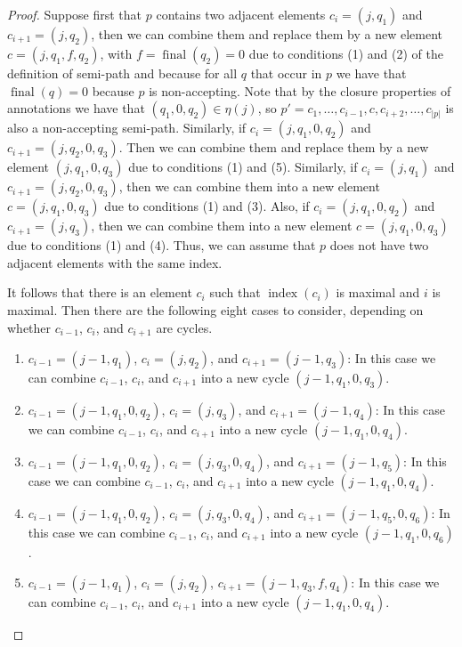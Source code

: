 \documentclass[10pt,a4paper]{amsart}
\theoremstyle{plain}
\theoremstyle{definition}
\theoremstyle{definition}
\DeclareMathOperator{\?}{?}
\DeclareMathOperator{\final}{final}
\DeclareMathOperator{\myindex}{index}
\begin{document}
\begin{proof}
Suppose first that $p$ contains two adjacent elements $c_i=(j,q_1)$ and $c_{i+1}=(j,q_2)$, then we can combine them and replace them by a new element $c=(j,q_1,f,q_2)$, with $f=\final(q_2) = 0$ due to conditions (1) and (2) of the definition of semi-path and because for all $q$ that occur in $p$ we have that $\final(q) = 0$ because $p$ is non-accepting.  Note that by the closure properties of annotations we have that $(q_1,0,q_2)\in\eta(j)$, so $p'=c_1,\ldots,c_{i-1},c,c_{i+2},\ldots,c_{|p|}$ is also a non-accepting semi-path. Similarly, if $c_i=(j,q_1,0,q_2)$ and $c_{i+1}=(j,q_2,0,q_3)$. Then we can combine them and replace them by a new element $(j,q_1,0,q_3)$ due to conditions (1) and (5). Similarly, if $c_i = (j,q_1)$ and $c_{i+1} = (j,q_2,0,q_3)$, then  we can combine them into a new element $c=(j,q_1,0,q_3)$ due to conditions (1) and (3). Also, if $c_i = (j,q_1,0,q_2)$ and $c_{i+1} = (j,q_3)$,  then  we can combine them into a new element $c=(j,q_1,0,q_3)$ due to conditions (1) and (4). Thus, we can assume that $p$ does not have two adjacent elements with the same index.

It follows that there is an element $c_i$ such that $\myindex(c_i)$ is maximal and $i$ is maximal. Then there are the following eight cases to consider, depending on whether $c_{i-1}$, $c_i$, and $c_{i+1}$ are cycles.
\begin{enumerate}
\item
$c_{i-1}=(j-1,q_1)$, $c_i=(j,q_2)$, and $c_{i+1}=(j-1,q_3)$: In this case we can combine $c_{i-1}$, $c_i$, and $c_{i+1}$ into a new cycle $(j-1,q_1,0,q_3)$.

\item
$c_{i-1}=(j-1,q_1,0,q_2)$, $c_i=(j,q_3)$, and $c_{i+1}=(j-1,q_4)$: In this case we can combine $c_{i-1}$, $c_i$, and $c_{i+1}$ into a new cycle $(j-1,q_1,0,q_4)$.

\item
$c_{i-1}=(j-1,q_1,0,q_2)$, $c_i=(j,q_3,0,q_4)$, and $c_{i+1}=(j-1,q_5)$: In this case we can combine $c_{i-1}$, $c_i$, and $c_{i+1}$ into a new cycle $(j-1,q_1,0,q_4)$.

\item
$c_{i-1}=(j-1,q_1,0,q_2)$, $c_i=(j,q_3,0,q_4)$, and $c_{i+1}=(j-1,q_5,0,q_6)$: In this case we can combine $c_{i-1}$, $c_i$, and $c_{i+1}$ into a new cycle $(j-1,q_1,0,q_6)$.
\item
$c_{i-1}=(j-1,q_1)$, $c_i=(j,q_2)$, $c_{i+1} = (j-1,q_3,f,q_4)$: In this case we can combine $c_{i-1}$, $c_i$, and $c_{i+1}$ into a new cycle $(j-1,q_1,0,q_4)$.


\end{enumerate}
\end{proof}
\end{document}
